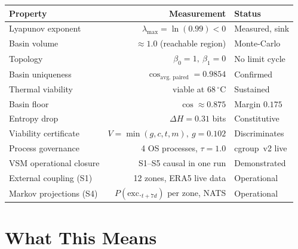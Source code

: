 \documentclass[11pt, a4paper]{article}
\begin{document}
\begin{tabular}{lrl}
\textbf{Property} & \textbf{Measurement} & \textbf{Status} \\
\hline
Lyapunov exponent       & $\lambda_\text{max} = \ln(0{.}99) < 0$   & Measured, sink \\
Basin volume            & $\approx 1{.}0$ (reachable region)        & Monte-Carlo \\
Topology                & $\beta_0 = 1,\ \beta_1 = 0$               & No limit cycle \\
Basin uniqueness        & $\cos_\text{avg.\ paired} = 0{.}9854$     & Confirmed \\
Thermal viability       & viable at $68\,^\circ\mathrm{C}$          & Sustained \\
Basin floor             & $\cos \approx 0{.}875$                    & Margin $0{.}175$ \\
Entropy drop            & $\Delta H = 0{.}31$ bits                  & Constitutive \\
Viability certificate   & $V = \min(g,c,t,m),\ g = 0{.}102$        & Discriminates \\
Process governance      & 4 OS processes, $\tau = 1{.}0$            & cgroup~v2 live \\
VSM operational closure & S1--S5 causal in one run                  & Demonstrated \\
\hline
External coupling (S1)  & 12 zones, ERA5 live data                  & Operational \\
Markov projections (S4) & $P(\text{exc.}_{t+7d})$ per zone, NATS    & Operational \\
\end{tabular}

\section*{What This Means}
\end{document}
